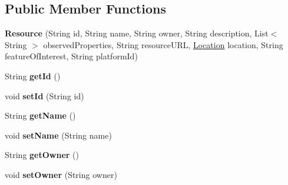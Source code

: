 \subsection*{Public Member Functions}
\begin{DoxyCompactItemize}
\item 
{\bfseries Resource} (String id, String name, String owner, String description, List$<$ String $>$ observed\+Properties, String resource\+U\+RL, \hyperlink{classeu_1_1h2020_1_1symbiote_1_1model_1_1Location}{Location} location, String feature\+Of\+Interest, String platform\+Id)\hypertarget{classeu_1_1h2020_1_1symbiote_1_1model_1_1Resource_a54cec3d9d4978f1457b601258ba78b0d}{}\label{classeu_1_1h2020_1_1symbiote_1_1model_1_1Resource_a54cec3d9d4978f1457b601258ba78b0d}

\item 
String {\bfseries get\+Id} ()\hypertarget{classeu_1_1h2020_1_1symbiote_1_1model_1_1Resource_a6d2b00f0e94b55cce1daff002012369c}{}\label{classeu_1_1h2020_1_1symbiote_1_1model_1_1Resource_a6d2b00f0e94b55cce1daff002012369c}

\item 
void {\bfseries set\+Id} (String id)\hypertarget{classeu_1_1h2020_1_1symbiote_1_1model_1_1Resource_a209815ba7cdb6b82334e664eb4c38708}{}\label{classeu_1_1h2020_1_1symbiote_1_1model_1_1Resource_a209815ba7cdb6b82334e664eb4c38708}

\item 
String {\bfseries get\+Name} ()\hypertarget{classeu_1_1h2020_1_1symbiote_1_1model_1_1Resource_a7332986d4dfa4ca233f705659f166f2c}{}\label{classeu_1_1h2020_1_1symbiote_1_1model_1_1Resource_a7332986d4dfa4ca233f705659f166f2c}

\item 
void {\bfseries set\+Name} (String name)\hypertarget{classeu_1_1h2020_1_1symbiote_1_1model_1_1Resource_ad2cd06bcbfa928adead9017509cc2e78}{}\label{classeu_1_1h2020_1_1symbiote_1_1model_1_1Resource_ad2cd06bcbfa928adead9017509cc2e78}

\item 
String {\bfseries get\+Owner} ()\hypertarget{classeu_1_1h2020_1_1symbiote_1_1model_1_1Resource_a0bd495e4c9a10fac6e885de268b5ad76}{}\label{classeu_1_1h2020_1_1symbiote_1_1model_1_1Resource_a0bd495e4c9a10fac6e885de268b5ad76}

\item 
void {\bfseries set\+Owner} (String owner)\hypertarget{classeu_1_1h2020_1_1symbiote_1_1model_1_1Resource_a4391365a9ef765fb9c96e8243a45fafb}{}\label{classeu_1_1h2020_1_1symbiote_1_1model_1_1Resource_a4391365a9ef765fb9c96e8243a45fafb}


\end{DoxyCompactItemize}
